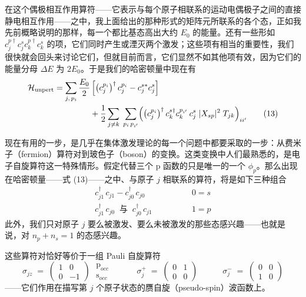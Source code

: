 在这个偶极相互作用算符——它表示与每个原子相联系的运动电偶极子之间的直接静电相互作用——之中，我上面给出的那种形式的矩阵元所联系的各个态，正如我先前概略说明的那样，每一个都比基态高出大约 $E_0$ 的能量。还有一些形如 $c_j^{p\dagger} c_j^{s} c_k^{p\dagger} c_k^{s}$ 的项，它们同时产生或湮灭两个激发；这些项有相当的重要性，我们很快就会回头来讨论它们，但就目前而言，它们显然不如其他项有效，因为它们的能量分母 $\Delta E$ 为 $2E_0$。于是我们的哈密顿量中现在有
\begin{align*}
\mathcal{H}_{\mathrm{unpert}} = \sum_{j,\,p_i} \frac{E_0}{2} & \left[ \left(c_j^{p_i}\right)^{\dagger} c_j^{p_i} - c_j^{s*} c_j^{s} \right] \\
& + \frac{1}{2} \sum_{j \neq k}\; \sum_{p_i\, p_{i'}} \Bigl( \left(c_j^{p_i}\right)^{\dagger} c_k^{s\dagger} c_k^{p_{i'}}\, c_j^{s}\; |X_{sp}|^2\; T_{jk} \Bigr)_{ii'} \tag{13}
\end{align*}

现在有用的一步，是几乎在集体激发理论的每一个问题中都要采取的一步：从费米子（fermion）算符对到玻色子（boson）的变换。这类变换中人们最熟悉的，是电子自旋算符这一特殊情形。假定代替三个 p 函数的只是唯一的一个 $\phi_p$。那么出现在哈密顿量——式 (13)——之中、与原子 $j$ 相联系的算符，将是如下三种组合
\begin{align*}
c_{j1}^{\dagger}\, c_{j1} - c_{j0}^{\dagger}\, c_{j0} \qquad & \qquad 0 = s \\
c_{j1}^{\dagger}\, c_{j0} \;\; \text{与} \;\; c_{j0}^{\dagger}\, c_{j1} \qquad & \qquad 1 = p
\end{align*}
此外，我们只对原子 $j$ 要么被激发、要么未被激发的那些态感兴趣——也就是说，对 $n_p + n_s = 1$ 的态感兴趣。

这些算符对恰好等价于一组 Pauli 自旋算符
\begin{equation*}
\sigma_{jz} \;=\; \begin{pmatrix} 1 & 0 \\ 0 & -1 \end{pmatrix}\;\begin{matrix} \mathrm{p}_{occ} \\ \mathrm{s}_{occ} \end{matrix} \qquad\quad \sigma_j^{+} \;=\; \begin{pmatrix} 0 & 1 \\ 0 & 0 \end{pmatrix} \qquad\quad \sigma_j^{-} \;=\; \begin{pmatrix} 0 & 0 \\ 1 & 0 \end{pmatrix}
\end{equation*}
——它们作用在描写第 $j$ 个原子状态的赝自旋（pseudo-spin）波函数上。

